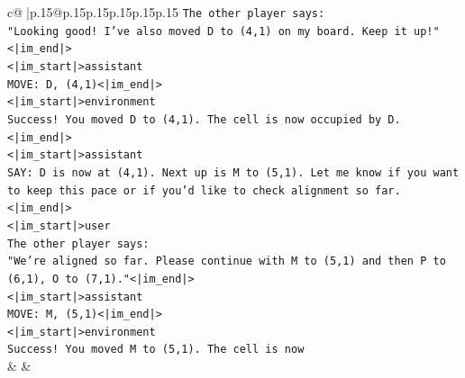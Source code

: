 \documentclass{article}
\begin{document}
{\begin{supertabular}{c@{$\;$}|p{.15\linewidth}@{}p{.15\linewidth}p{.15\linewidth}p{.15\linewidth}p{.15\linewidth}p{.15\linewidth}}
{{{\texttt{The other player says:} \\
\texttt{"Looking good! I've also moved D to (4,1) on my board. Keep it up!"<|im\_end|>} \\
\texttt{<|im\_start|>assistant} \\
\texttt{MOVE: D, (4,1)<|im\_end|>} \\
\texttt{<|im\_start|>environment} \\
\texttt{Success! You moved D to (4,1). The cell is now occupied by D.<|im\_end|>} \\
\texttt{<|im\_start|>assistant} \\
\texttt{SAY: D is now at (4,1). Next up is M to (5,1). Let me know if you want to keep this pace or if you'd like to check alignment so far.<|im\_end|>} \\
\texttt{<|im\_start|>user} \\
\texttt{The other player says:} \\
\texttt{"We're aligned so far. Please continue with M to (5,1) and then P to (6,1), O to (7,1)."<|im\_end|>} \\
\texttt{<|im\_start|>assistant} \\
\texttt{MOVE: M, (5,1)<|im\_end|>} \\
\texttt{<|im\_start|>environment} \\
\texttt{Success! You moved M to (5,1). The cell is now} \\
            }
        }
    }
    & & \\ \\


\end{supertabular}}
\end{document}
